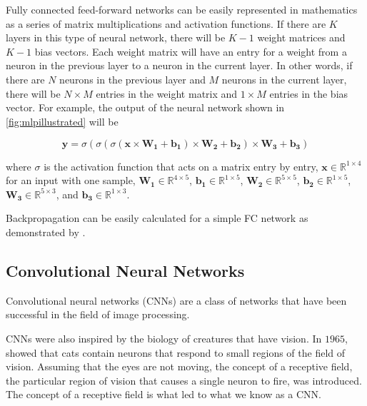 Fully connected feed-forward networks can be easily represented in mathematics as a series of matrix multiplications and activation functions. If there are $K$ layers in this type of neural network, there will be $K-1$ weight matrices and $K-1$ bias vectors. Each weight matrix will have an entry for a weight from a neuron in the previous layer to a neuron in the current layer. In other words, if there are $N$ neurons in the previous layer and $M$ neurons in the current layer, there will be $N \times M$ entries in the weight matrix and $1 \times M$ entries in the bias vector. For example, the output of the neural network shown in \cref{fig:mlpillustrated} will be 

\begin{equation}
	\mathbf{\hat{y}} = \sigma(\sigma(\sigma(\mathbf{x} \times \mathbf{W_1} + \mathbf{b_1}) \times \mathbf{W_2} + \mathbf{b_2}) \times \mathbf{W_3} + \mathbf{b_3})
\end{equation}

\noindent
where $\sigma$ is the activation function that acts on a matrix entry by entry, $ \mathbf{x} \in \mathbb{R}^{1 \times 4} $ for an input with one sample, $\mathbf{W_1} \in \mathbb{R}^{4 \times 5}$, $\mathbf{b_1} \in \mathbb{R}^{1 \times 5}$, $\mathbf{W_2} \in \mathbb{R}^{5 \times 5}$, $\mathbf{b_2} \in \mathbb{R}^{1 \times 5}$,  $\mathbf{W_3} \in \mathbb{R}^{5 \times 3}$, and $\mathbf{b_3} \in \mathbb{R}^{1 \times 3}$. 

Backpropagation can be easily calculated for a simple FC network as demonstrated by \citet{ai_text_book}. 


\subsection{Convolutional Neural Networks}
\label{cnns}

Convolutional neural networks (CNNs) are a class of networks that have been successful in the field of image processing. 

CNNs were also inspired by the biology of creatures that have vision. In $1965$, \citet{receptive_field} showed that cats contain neurons that respond to small regions of the field of vision. Assuming that the eyes are not moving, the concept of a receptive field, the particular region of vision that causes a single neuron to fire, was introduced. The concept of a receptive field is what led to what we know as a CNN.

